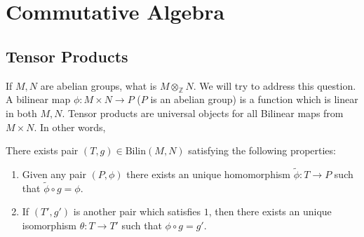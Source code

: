 \documentclass[oneside, 12pt]{scrbook}
\newcommand{\ZZ}{\mathbb Z}
\theoremstyle{theorem}
\begin{document}
\part{Commutative Algebra}

\chapter{Tensor Products}

If $M,N$ are abelian groups, what is $M \otimes_{\ZZ} N$. We will try to address this question. A bilinear map $\phi : M\times N \rightarrow P$ ($P$ is an abelian group) is a function which is linear in both $M,N$. Tensor products are universal objects for all Bilinear maps from $M \times N$. In other words, 

\begin{theorem}
There exists pair $(T,g) \in \mathrm{Bilin}(M,N)$ satisfying the following properties: 
\begin{enumerate}
\item Given any pair $(P, \phi)$ there exists an unique homomorphism $\tilde{\phi} : T \rightarrow P$ such that $\tilde{\phi} \circ g = \phi$.
\item If $(T',g')$ is another pair which satisfies $1$, then there exists an unique isomorphism $\theta : T \rightarrow T'$ such that $\phi \circ g = g'$.
\end{enumerate}
\end{theorem}
\end{document}
